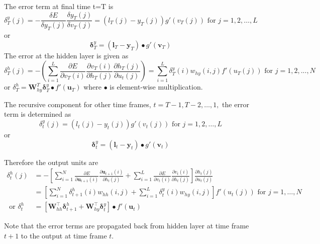 The error term at final time t=T is
\begin{equation}
\delta^y_T(j)=-\frac{\delta E}{\delta y_T(j)}\frac{\delta y_T(j)}{\delta v_T(j)}=(l_T(j)-y_T(j))g'(v_T(j))\text{ for } j=1,2,\dots,L \label{eqn_c3_bptt04}\end{equation}
or
\begin{equation}
\mathbf{\delta}_T^y=(\mathbf{l}_T-\mathbf{y}_T)\bullet g'(\mathbf{v}_T) \label{eqn_c3_bptt05}\end{equation}
The error at the hidden layer is given as
\begin{equation}
\delta_T^h(j)=-\left(\sum_{i=1}^L\frac{\partial E}{\partial v_T(i)}\frac{\partial v_T(i)}{\partial h_T(j)}\frac{\partial h_T(j)}{\partial u_t(j)}\right)=\sum_{i=1}^L\delta_T^y(i)w_{hy}(i,j)f'(u_T(j))\text{ for } j=1,2,...,N \label{eqn_c3_bptt06}
\end{equation}
or $\delta_T^h=\mathbf{W}_{hy}^T\mathbf{\delta}_T^y\bullet f'(\mathbf{u}_T)$
where $\bullet$ is element-wise multiplication.

The recursive component for other time frames, $t=T-1, T-2, …, 1,$ the error term is determined as
\begin{equation}
\delta_t^y(j)=(l_t(j)-y_t(j))g'(v_t(j))\text{ for } j=1,2,\dots,L
\label{eqn_c3_bptt07}\end{equation}
or \begin{equation}
\mathbf{\delta}_t^y = (\mathbf{l}_t-\mathbf{y}_t)\bullet g'(\mathbf{v}_t) \label{eqn_c3_bptt08}\end{equation}

Therefore the output units are \begin{equation}\begin{aligned}\delta_t^h(j)&=-\left[\sum_{i=1}^N\frac{\partial E}{\partial\mathbf{u}_{t+1}(i)}\frac{\partial\mathbf{u}_{t+1}(i)}{\partial h_t(j)}+\sum_{i=1}^L\frac{\partial E}{\partial v_t(i)}\frac{\partial v_t(i)}{\partial h_t(j)}\right]\frac{\partial h_t(j)}{\partial u_t(j)}\\ &=\left[\sum_{i=1}^N\delta_{t+1}^h(i)w_{hh}(i,j)+\sum_{i=1}^L\delta_t^y(i)w_{hy}(i,j)\right]f'(u_t(j)) \text{ for }j=1,\dots,N \\ \text{ or } \delta_t^h&=\left[\mathbf{W}_{hh}^\top\mathbf{\delta}_{t+1}^h+\mathbf{W}_{hy}^\top\mathbf{\delta}_t^y\right]\bullet f'(\mathbf{u}_t)\end{aligned}\label{eqn_c3_bptt09}\end{equation}

Note that the error terms are propagated back from hidden layer at time frame $t + 1$ to the output at time frame $t$.

